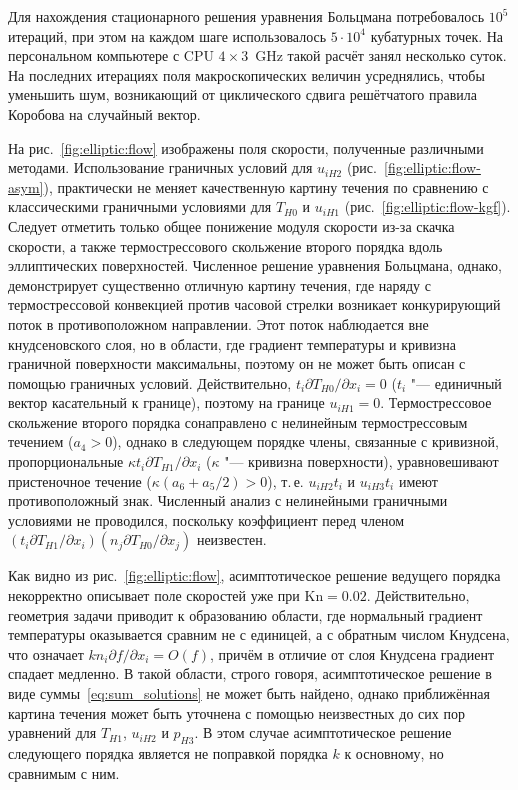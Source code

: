 \documentclass[
aps,%
12pt,%
final,%
notitlepage,%
oneside,%
onecolumn,%
nobibnotes,%
nofootinbib,%
superscriptaddress,%
noshowpacs,%
showkeys,%
floatfix,%
tightenlines,%
centertags]%
{revtex4}
\newcommand{\Kn}{\mathrm{Kn}}
\newcommand{\Pder}[2][]{\partial#1/\partial#2}
\newcommand{\OO}[1]{O(#1)}
\begin{document}
Для нахождения стационарного решения уравнения Больцмана потребовалось \(10^5\) итераций,
при этом на каждом шаге использовалось \(5\cdot10^4\) кубатурных точек.
На персональном компьютере с CPU \(4\times3\)~GHz такой расчёт занял несколько суток.
На последних итерациях поля макроскопических величин усреднялись,
чтобы уменьшить шум, возникающий от циклического сдвига решётчатого правила Коробова
на случайный вектор.

На рис.~\ref{fig:elliptic:flow} изображены поля скорости, полученные различными методами.
Использование граничных условий для \(u_{iH2}\) (рис.~\ref{fig:elliptic:flow-asym}),
практически не меняет качественную картину течения по сравнению с классическими
граничными условиями для \(T_{H0}\) и \(u_{iH1}\) (рис.~\ref{fig:elliptic:flow-kgf}).
Следует отметить только общее понижение модуля скорости из-за скачка скорости,
а также термострессового скольжение второго порядка вдоль эллиптических поверхностей.
Численное решение уравнения Больцмана, однако, демонстрирует существенно отличную картину течения,
где наряду с термострессовой конвекцией против часовой стрелки возникает конкурирующий поток
в противоположном направлении. Этот поток наблюдается вне кнудсеновского слоя, но в области,
где градиент температуры и кривизна граничной поверхности максимальны,
поэтому он не может быть описан с помощью граничных условий.
Действительно, \(t_i\Pder[T_{H0}]{x_i}=0\) (\(t_i\) "--- единичный вектор касательный к границе),
поэтому на границе \(u_{iH1}=0\).
Термострессовое скольжение второго порядка сонаправлено с нелинейным термострессовым течением (\(a_4>0\)),
однако в следующем порядке члены, связанные с кривизной, пропорциональные \(\kappa t_i\Pder[T_{H1}]{x_i}\)
(\(\kappa\) "--- кривизна поверхности), уравновешивают пристеночное течение (\(\kappa(a_6+a_5/2)>0\)),
т.\,е. \(u_{iH2}t_i\) и \(u_{iH3}t_i\) имеют противоположный знак.
Численный анализ с нелинейными граничными условиями не проводился,
поскольку коэффициент перед членом \((t_i\Pder[T_{H1}]{x_i})(n_j\Pder[T_{H0}]{x_j})\) неизвестен.

Как видно из рис.~\ref{fig:elliptic:flow}, асимптотическое решение ведущего порядка некорректно описывает
поле скоростей уже при \(\Kn=0.02\). Действительно, геометрия задачи приводит к образованию области,
где нормальный градиент температуры оказывается сравним не с единицей, а с обратным числом Кнудсена,
что означает \(kn_i\Pder[f]{x_i} = \OO{f}\), причём в отличие от слоя Кнудсена градиент спадает медленно.
В такой области, строго говоря, асимптотическое решение в виде суммы~\eqref{eq:sum_solutions}
не может быть найдено, однако приближённая картина течения может быть уточнена
с помощью неизвестных до сих пор уравнений для \(T_{H1}\), \(u_{iH2}\) и \(p_{H3}\).
В этом случае асимптотическое решение следующего порядка является не поправкой порядка \(k\)
к основному, но сравнимым с ним.
\end{document}
